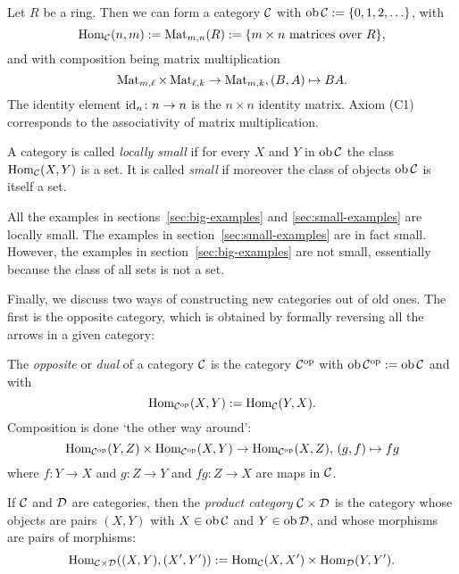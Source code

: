 \begin{example} \label{exa:category-of-matrices}
Let $R$ be a ring. Then we can form a category ${\mathcal{C}}$  with $\operatorname{ob} {\mathcal{C}} :=\{ 0, 1, 2, \ldots \}$,  with
\[
	\operatorname{Hom}_{\mathcal{C}}(n,m) := \operatorname{Mat}_{m,n}(R) := \{ \text{$m\times n$ matrices over $R$} \},
\]
and with composition being matrix multiplication
\[
	 \operatorname{Mat}_{m,\ell} \times \operatorname{Mat}_{\ell,k}  \to \operatorname{Mat}_{m,k}, (B,A) \mapsto BA.
\]
The identity element ${\rm id}_n\colon n \to n$ is the $n\times n$ identity matrix. Axiom (C1) corresponds to the associativity of matrix multiplication.
\end{example}

\begin{definition}\label{def:small-category}
A category is called \emph{locally small} if for every $X$ and $Y$ in $\operatorname{ob} {\mathcal{C}}$ the class $\operatorname{Hom}_{{\mathcal{C}}}(X,Y)$ is a set. It is called \emph{small} if moreover the class of objects $\operatorname{ob} {\mathcal{C}}$ is itself a set.
\end{definition}

\begin{examples}
All the examples in sections~\ref{sec:big-examples} and \ref{sec:small-examples} are locally small. The examples in section~\ref{sec:small-examples} are in fact small. However, the examples in section~\ref{sec:big-examples} are not small, essentially because the class of all sets is not a set.
\end{examples}


Finally, we discuss two ways of constructing new categories out of old ones. The first is the opposite category, which is obtained by formally reversing all the arrows in a given category:
 
\begin{definition}\label{def:opposite-category}
The \emph{opposite} or \emph{dual} of a category ${\mathcal{C}}$ is the category ${\mathcal{C}}^{\mathrm{op}}$ with $\operatorname{ob} {\mathcal{C}}^{\mathrm{op}} := \operatorname{ob}{\mathcal{C}}$ and with
\[
	\operatorname{Hom}_{{\mathcal{C}}^{\mathrm{op}}}(X,Y) := \operatorname{Hom}_{\mathcal{C}}(Y,X).
\]
Composition is done `the other way around': 
\[
	\operatorname{Hom}_{{\mathcal{C}}^{\mathrm{op}}}(Y,Z) \times \operatorname{Hom}_{{\mathcal{C}}^{\mathrm{op}}}(X,Y)   \to \operatorname{Hom}_{{\mathcal{C}}^{\mathrm{op}}}(X,Z),\,
	(g,f) \mapsto fg
\]
where $f\colon Y \to X$ and $g\colon Z\to Y$ and $fg\colon Z \to X$ are maps in ${\mathcal{C}}$.
\end{definition}

\begin{definition}\label{def:product-category}
If ${\mathcal{C}}$ and ${\mathcal{D}}$ are categories, then the \emph{product category}
${\mathcal{C}}\times {\mathcal{D}}$ is the category whose objects are pairs $(X,Y)$ with $X\in \operatorname{ob} {\mathcal{C}}$ and $Y\in \operatorname{ob} {\mathcal{D}}$, and whose morphisms are pairs of morphisms:
\[
	\operatorname{Hom}_{{\mathcal{C}}\times {\mathcal{D}}}((X,Y),(X',Y')) := \operatorname{Hom}_{\mathcal{C}}(X,X') \times \operatorname{Hom}_{\mathcal{D}}(Y,Y').
\]
\end{definition}

